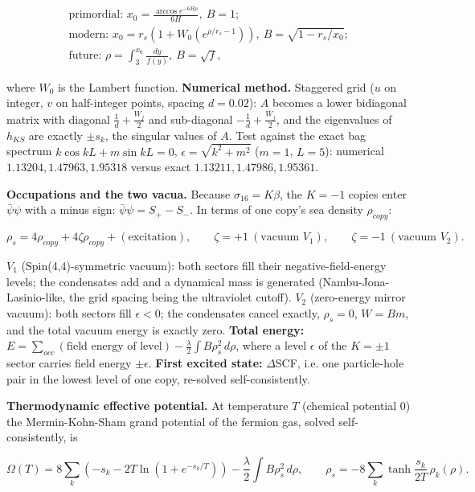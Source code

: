 \documentclass[10pt]{article}
\makeatletter
\newcommand\keepnext{\par\nopagebreak\@nobreaktrue\everypar{\@nobreakfalse\everypar{}}}
\makeatother
\begin{document}
\[
\begin{gathered}
\text{primordial: } x_0 = \frac{\arccos e^{-6H\rho}}{6H},\ B = 1; \\
\text{modern: } x_0 = r_s\left(1 + W_0\!\left(e^{\rho/r_s - 1}\right)\right),\ B = \sqrt{1 - r_s/x_0}; \\
\text{future: } \rho = \int_{3}^{x_0}\frac{dy}{f(y)},\ B = \sqrt f,
\end{gathered}
\]

where $W_0$ is the Lambert function. \textbf{Numerical method.} Staggered grid ($u$ on integer, $v$ on half-integer points, spacing $d = 0.02$): $A$ becomes a lower bidiagonal matrix with diagonal $\frac1d + \frac{W_{j}}2$ and sub-diagonal $-\frac1d + \frac{W_j}2$, and the eigenvalues of $h_{KS}$ are exactly $\pm s_k$, the singular values of $A$. Test against the exact bag spectrum $k\cos kL + m\sin kL = 0$, $\epsilon = \sqrt{k^2+m^2}$ ($m=1$, $L=5$): numerical $1.13204, 1.47963, 1.95318$ versus exact $1.13211, 1.47986, 1.95361$.


\textbf{Occupations and the two vacua.} Because $\sigma_{16} = K\beta$, the $K=-1$ copies enter $\bar\psi\psi$ with a minus sign: $\bar\psi\psi = S_+ - S_-$. In terms of one copy's sea density $\rho_{copy}$:\keepnext


\[
\rho_s = 4\rho_{copy} + 4\zeta\rho_{copy} + (\text{excitation}),\qquad \zeta = +1\ (\text{vacuum } V_1),\qquad \zeta = -1\ (\text{vacuum } V_2).
\]

$V_1$ (Spin(4,4)-symmetric vacuum): both sectors fill their negative-field-energy levels; the condensates add and a dynamical mass is generated (Nambu-Jona-Lasinio-like, the grid spacing being the ultraviolet cutoff). $V_2$ (zero-energy mirror vacuum): both sectors fill $\epsilon < 0$; the condensates cancel exactly, $\rho_s = 0$, $W = Bm$, and the total vacuum energy is exactly zero. \textbf{Total energy:} $E = \sum_{occ}(\text{field energy of level}) - \frac\lambda2\int B\rho_s^2\,d\rho$, where a level $\epsilon$ of the $K=\pm1$ sector carries field energy $\pm\epsilon$. \textbf{First excited state:} $\Delta$SCF, i.e. one particle-hole pair in the lowest level of one copy, re-solved self-consistently.


\textbf{Thermodynamic effective potential.} At temperature $T$ (chemical potential 0) the Mermin-Kohn-Sham grand potential of the fermion gas, solved self-consistently, is\keepnext


\[
\Omega(T) = 8\sum_k\left(-s_k - 2T\ln\left(1 + e^{-s_k/T}\right)\right) - \frac\lambda2\int B\rho_s^2\,d\rho,\qquad \rho_s = -8\sum_k\tanh\frac{s_k}{2T}\,\rho_k(\rho).
\]
\end{document}
